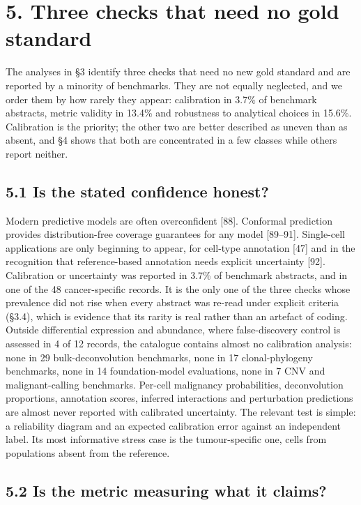 \documentclass{article}
\begin{document}
\section{5. Three checks that need no gold standard}\label{three-checks-that-need-no-gold-standard}

The analyses in §3 identify three checks that need no new gold standard
and are reported by a minority of benchmarks. They are not equally
neglected, and we order them by how rarely they appear: calibration in
3.7\% of benchmark abstracts, metric validity in 13.4\% and robustness
to analytical choices in 15.6\%. Calibration is the priority; the other
two are better described as uneven than as absent, and §4 shows that
both are concentrated in a few classes while others report neither.

\subsection{5.1 Is the stated confidence honest?}\label{is-the-stated-confidence-honest}

Modern predictive models are often overconfident {[}88{]}. Conformal
prediction provides distribution-free coverage guarantees for any model
{[}89--91{]}. Single-cell applications are only beginning to appear, for
cell-type annotation {[}47{]} and in the recognition that
reference-based annotation needs explicit uncertainty {[}92{]}.
Calibration or uncertainty was reported in 3.7\% of benchmark abstracts,
and in one of the 48 cancer-specific records. It is the only one of the
three checks whose prevalence did not rise when every abstract was
re-read under explicit criteria (§3.4), which is evidence that its
rarity is real rather than an artefact of coding. Outside differential
expression and abundance, where false-discovery control is assessed in 4
of 12 records, the catalogue contains almost no calibration analysis:
none in 29 bulk-deconvolution benchmarks, none in 17 clonal-phylogeny
benchmarks, none in 14 foundation-model evaluations, none in 7 CNV and
malignant-calling benchmarks. Per-cell malignancy probabilities,
deconvolution proportions, annotation scores, inferred interactions and
perturbation predictions are almost never reported with calibrated
uncertainty. The relevant test is simple: a reliability diagram and an
expected calibration error against an independent label. Its most
informative stress case is the tumour-specific one, cells from
populations absent from the reference.

\subsection{5.2 Is the metric measuring what it claims?}\label{is-the-metric-measuring-what-it-claims}
\end{document}
